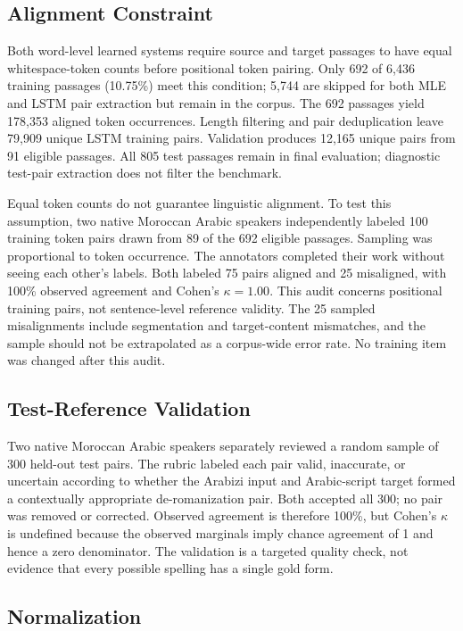 \documentclass[runningheads]{llncs}
\begin{document}
\subsection{Alignment Constraint}

Both word-level learned systems require source and target passages to have equal whitespace-token counts before positional token pairing. Only 692 of 6,436 training passages (10.75\%) meet this condition; 5,744 are skipped for both MLE and LSTM pair extraction but remain in the corpus. The 692 passages yield 178,353 aligned token occurrences. Length filtering and pair deduplication leave 79,909 unique LSTM training pairs. Validation produces 12,165 unique pairs from 91 eligible passages. All 805 test passages remain in final evaluation; diagnostic test-pair extraction does not filter the benchmark.

Equal token counts do not guarantee linguistic alignment. To test this assumption, two native Moroccan Arabic speakers independently labeled 100 training token pairs drawn from 89 of the 692 eligible passages. Sampling was proportional to token occurrence. The annotators completed their work without seeing each other's labels. Both labeled 75 pairs aligned and 25 misaligned, with 100\% observed agreement and Cohen's $\kappa=1.00$. This audit concerns positional training pairs, not sentence-level reference validity. The 25 sampled misalignments include segmentation and target-content mismatches, and the sample should not be extrapolated as a corpus-wide error rate. No training item was changed after this audit.

\subsection{Test-Reference Validation}

Two native Moroccan Arabic speakers separately reviewed a random sample of 300 held-out test pairs. The rubric labeled each pair valid, inaccurate, or uncertain according to whether the Arabizi input and Arabic-script target formed a contextually appropriate de-romanization pair. Both accepted all 300; no pair was removed or corrected. Observed agreement is therefore 100\%, but Cohen's $\kappa$ is undefined because the observed marginals imply chance agreement of 1 and hence a zero denominator. The validation is a targeted quality check, not evidence that every possible spelling has a single gold form.

\subsection{Normalization}
\end{document}
